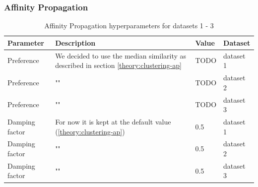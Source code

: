 \subsubsection{Affinity Propagation}
\begin{table}[h]
  \begin{tabular}{|l|p{6cm}|l|l|}
    \hline
    Parameter      & Description                                                                                & Value & Dataset   \\
    \hline
    Preference     & We decided to use the median similarity as described in section \ref{theory:clustering-ap} & TODO  & dataset 1 \\
    \hline
    Preference     & ""                                                                                         & TODO  & dataset 2 \\
    \hline
    Preference     & ""                                                                                         & TODO  & dataset 3 \\
    \hline
    Damping factor & For now it is kept at the default value (\ref{theory:clustering-ap})                       & 0.5   & dataset 1 \\
    \hline
    Damping factor & ""                                                                                         & 0.5   & dataset 2 \\
    \hline
    Damping factor & ""                                                                                         & 0.5   & dataset 3 \\
    \hline
  \end{tabular}
  \caption{Affinity Propagation hyperparameters for datasets 1 - 3}
  \label{tab:ap-formula-sklearn}
\end{table}
\newpage
